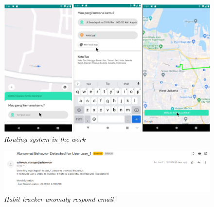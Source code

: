 \begin{figure}
    \centering
    \includegraphics[width=\textwidth]{chapters/images/route-sys.png}
    \caption{\textit{Routing system in the work}}
    \label{fig:gambar8.2}
\end{figure}

\begin{figure}
    \centering
    \includegraphics[width=\textwidth]{chapters/images/habit-tracker.png}
    \caption{\textit{Habit tracker anomaly respond email}}
    \label{fig:gambar8.3}
\end{figure}